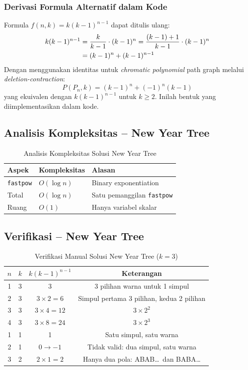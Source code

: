\documentclass[12pt,a4paper]{article}
\theoremstyle{definition}
\begin{document}
\subsubsection{Derivasi Formula Alternatif dalam Kode}

Formula $f(n,k) = k(k-1)^{n-1}$ dapat ditulis ulang:
\begin{align}
  k(k-1)^{n-1}
  &= \frac{k}{k-1}\cdot(k-1)^n
   = \frac{(k-1)+1}{k-1}\cdot(k-1)^n\notag\\
  &= (k-1)^n + (k-1)^{n-1}
\end{align}
Dengan menggunakan identitas untuk \emph{chromatic polynomial} path graph melalui
\emph{deletion-contraction}:
\begin{equation}
  P(P_n,k) = (k-1)^n + (-1)^n(k-1)
\end{equation}
yang ekuivalen dengan $k(k-1)^{n-1}$ untuk $k\geq 2$. Inilah bentuk yang
diimplementasikan dalam kode.

\subsection{Analisis Kompleksitas -- New Year Tree}

\begin{table}[H]
\centering
\caption{Analisis Kompleksitas Solusi New Year Tree}
\begin{tabular}{lll}
\toprule
\textbf{Aspek} & \textbf{Kompleksitas} & \textbf{Alasan}\\
\midrule
\texttt{fastpow} & $O(\log n)$ & Binary exponentiation\\
Total            & $O(\log n)$ & Satu pemanggilan \texttt{fastpow}\\
Ruang            & $O(1)$      & Hanya variabel skalar\\
\bottomrule
\end{tabular}
\end{table}

\subsection{Verifikasi -- New Year Tree}

\begin{table}[H]
\centering
\caption{Verifikasi Manual Solusi New Year Tree ($k=3$)}
\begin{tabular}{cccc}
\toprule
$n$ & $k$ & $k(k-1)^{n-1}$ & Keterangan\\
\midrule
1 & 3 & 3             & 3 pilihan warna untuk 1 simpul\\
2 & 3 & $3\times 2=6$ & Simpul pertama 3 pilihan, kedua 2 pilihan\\
3 & 3 & $3\times 4=12$ & $3\times 2^2$\\
4 & 3 & $3\times 8=24$ & $3\times 2^3$\\
1 & 1 & 1             & Satu simpul, satu warna\\
2 & 1 & $0\to -1$     & Tidak valid: dua simpul, satu warna\\
3 & 2 & $2\times 1=2$ & Hanya dua pola: ABAB\ldots\ dan BABA\ldots\\
\bottomrule
\end{tabular}
\end{table}
\end{document}
